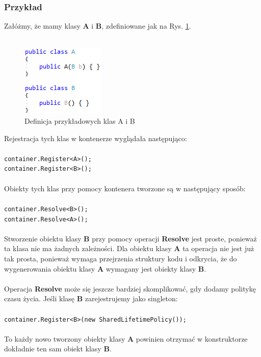 \documentclass[12pt]{article}
\begin{document}
\subsubsection{Przykład}
Załóżmy, że mamy klasy \textbf{A} i \textbf{B}, zdefiniowane jak na Rys. \ref{fig:Example_Container}. \\ \\
\begin{figure}[H]
	\begin{center}
  		\includegraphics{Example_Container.png}
  		\caption{Definicja przykładowych klas A i B}
  		\label{fig:Example_Container}
	\end{center}
\end{figure}
Rejestracja tych klas w kontenerze wyglądała następująco: \\
\\
\texttt{container.Register<A>();\\
container.Register<B>();}\\
\\
Obiekty tych klas przy pomocy kontenera tworzone są w następujący sposób: \\
\\
\texttt{container.Resolve<B>();\\
container.Resolve<A>();}\\
\\
Stworzenie obiektu klasy \textbf{B} przy pomocy operacji \textbf{Resolve} jest proste, ponieważ ta klasa nie ma żadnych zależności. Dla obiektu klasy \textbf{A} ta operacja nie jest już tak prosta, ponieważ wymaga przejrzenia struktury kodu i odkrycia, że do wygenerowania obiektu klasy \textbf{A} wymagany jest obiekty klasy \textbf{B}.\\
\\Operacja \textbf{Resolve} może się jeszcze bardziej skomplikować, gdy dodamy politykę czasu życia. Jeśli klasę \textbf{B} zarejestrujemy jako singleton:\\
\\
\texttt{container.Register<B>(new SharedLifetimePolicy());}\\
\\
To każdy nowo tworzony obiekty klasy \textbf{A} powinien otrzymać w konstruktorze dokładnie ten sam obiekt klasy \textbf{B}.\\
\end{document}

